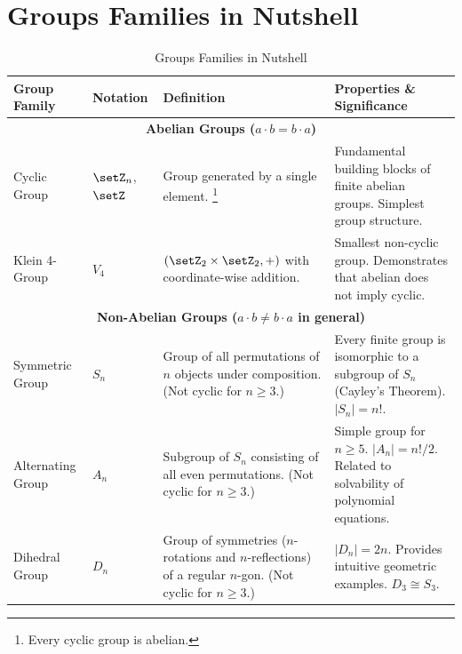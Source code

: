 


\section*{Groups Families in Nutshell}
\begin{table}[htbp]
  \centering
  \caption{Groups Families in Nutshell}
  \label{tab:group_summary}
  \renewcommand{\arraystretch}{1.6}
  \begin{tabularx}{\textwidth}{@{} l l X X @{}}
    \hline
    \textbf{Group Family} & \textbf{Notation} & 
    \textbf{Definition} & \textbf{Properties \& Significance} \\
    \hline
    \multicolumn{4}{c}{\textbf{Abelian Groups ($a \cdot b = b \cdot a$)}} \\
    \hline
    Cyclic Group 
    & $\setZ_n$, $\setZ$ 
    & Group generated by a single element. \footnote{Every cyclic group is abelian.}
    & Fundamental building blocks of finite abelian groups. Simplest group structure. \\
    \rule{0pt}{3ex}
    Klein 4-Group & $V_4$ & $(\setZ_2 \times \setZ_2, +)$ 
    with coordinate-wise addition. & Smallest non-cyclic group. 
    Demonstrates that abelian does not imply cyclic. \\
    \hline
    \multicolumn{4}{c}{\textbf{Non-Abelian Groups ($a \cdot b \neq b \cdot a$ in general)}} \\
    \hline
    \rule{0pt}{3ex}
    Symmetric Group 
    & $S_n$ 
    & Group of all permutations of $n$ objects under composition. (Not cyclic for $n \geq 3$.)
    & Every finite group is isomorphic to a subgroup of $S_n$ (Cayley's Theorem). 
    $|S_n| = n!$. \\ 
    \rule{0pt}{3ex}
    Alternating Group 
    & $A_n$ 
    & Subgroup of $S_n$ consisting of all even permutations. (Not cyclic for $n \geq 3$.)
    & Simple group for $n \geq 5$. $|A_n| = n!/2$. 
    Related to solvability of polynomial equations. \\
    \rule{0pt}{3ex}
    Dihedral Group 
    & $D_n$ 
    & Group of symmetries ($n$-rotations and $n$-reflections) of a regular $n$-gon. (Not cyclic for $n \geq 3$.) 
    & $|D_n| = 2n$. Provides intuitive geometric examples. $D_3 \cong S_3$. \\
    \hline
  \end{tabularx}
\end{table}



